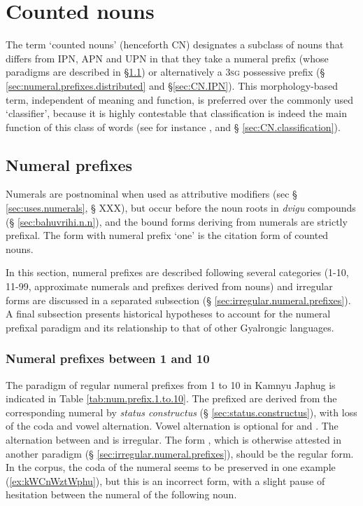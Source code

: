 \section{Counted nouns} \label{sec:counted.nouns}

The term `counted nouns' (henceforth CN) designates a subclass of nouns that differs from IPN, APN and UPN in that they take a numeral prefix (whose paradigms are described in §\ref{sec:numeral.prefixes}) or alternatively a \textsc{3sg} possessive prefix (§ \ref{sec:numeral.prefixes.distributed} and §\ref{sec:CN.IPN}). This morphology-based term, independent of meaning and function, is preferred over the commonly used  `classifier', because it is highly contestable that classification is indeed the main function of this class of words (see for instance \citealt{francois99classificateurs}, and § \ref{sec:CN.classification}).

\subsection{Numeral prefixes} \label{sec:numeral.prefixes}
Numerals are postnominal when used as attributive modifiers (sec § \ref{sec:uses.numerals}, § XXX), but occur before the noun roots in \textit{dvigu} compounds (§ \ref{sec:bahuvrihi.n.n}), and the bound forms deriving from numerals are strictly prefixal. The form with numeral prefix `one' is the citation form of counted nouns.

In this section, numeral prefixes are described following several categories (1-10, 11-99, approximate numerals and prefixes derived from nouns) and irregular forms are discussed in a separated subsection (§ \ref{sec:irregular.numeral.prefixes}). A final subsection presents historical hypotheses to account for the numeral prefixal paradigm and its relationship to that of other Gyalrongic languages.

\begin{center}

\end{center}\subsubsection{Numeral prefixes between 1 and 10} \label{sec:num.prefixes.1.10}
The paradigm of regular numeral prefixes from 1 to 10 in Kamnyu Japhug is indicated in Table \ref{tab:num.prefix.1.to.10}. The prefixed are derived from the corresponding numeral by \textit{status constructus} (§ \ref{sec:status.constructus}), with loss of the coda and vowel alternation. Vowel alternation is optional for  and  . The alternation between  and  is irregular. The form , which is otherwise attested in another  paradigm (§ \ref{sec:irregular.numeral.prefixes}), should be the regular form. In the corpus,  the coda  of the numeral  seems to be preserved in one example (\ref{ex:kWCnWztWphu}), but this is an incorrect form, with a slight pause of hesitation between the numeral of the following noun.


